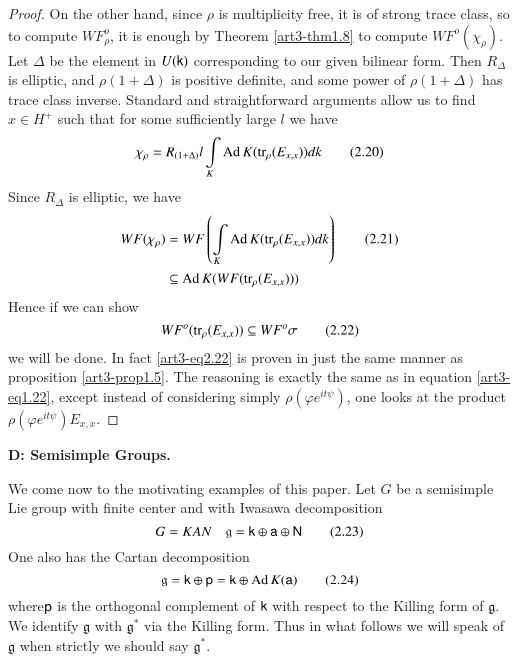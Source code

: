 \begin{proof}
On the other hand, since $\rho$ is multiplicity free, it is of strong trace class, so to compute $WF^{o}_{\rho}$, it is enough by Theorem \ref{art3-thm1.8} to compute $WF^{o}(\chi_{\rho})$. Let $\Delta$ be the element in $U(\mathsf{k})$ corresponding to our given bilinear form. Then $R_{\Delta}$ is elliptic, and $\rho(1+\Delta)$ is positive definite, and some power of $\rho(1+\Delta)$ has trace class inverse. Standard and straightforward arguments allow us to find $x\in H^{+}$ such that for some sufficiently large $l$ we have
\begin{equation*}
\chi_{\rho}=R_{(1+\Delta)}l\int\limits_{K}\operatorname{Ad} K(\operatorname{tr}_{\rho}(E_{x,x}))dk\tag{2.20}\label{art3-eq2.20}
\end{equation*}
Since $R_{\Delta}$ is elliptic, we have
\begin{align*}
WF(\chi_{\rho}) &= WF\left(\int\limits_{K}\operatorname{Ad} K(\operatorname{tr}_{\rho}(E_{x,x}))dk\right)\tag{2.21}\label{art3-eq2.21}\\
&\subseteq \operatorname{Ad} K(WF(\operatorname{tr}_{\rho}(E_{x,x})))
\end{align*}
Hence if we can show
\begin{equation*}
WF^{o}(\operatorname{tr}_{\rho}(E_{x,x}))\subseteq WF^{o}\sigma\tag{2.22}\label{art3-eq2.22}
\end{equation*}
we will be done. In fact \eqref{art3-eq2.22} is proven in just the same manner as proposition \ref{art3-prop1.5}. The reasoning is exactly the same as in equation \eqref{art3-eq1.22}, except instead of considering simply $\rho(\varphi e^{it\psi})$, one looks at the product $\rho(\varphi e^{it\psi})E_{x,x}$.
\end{proof}

\bigskip
\noindent
{\bf D: Semisimple Groups.}
\smallskip

We come now to the motivating examples of this paper. Let $G$ be a semisimple Lie group with finite center and with Iwasawa decomposition 
\begin{equation*}
G=KAN\quad \mathfrak{g}=\mathsf{k}\oplus \mathsf{a}\oplus \mathsf{N}\tag{2.23}\label{art3-eq2.23}
\end{equation*}
One also has the Cartan decomposition
\begin{equation*}
\mathfrak{g}=\mathsf{k}\oplus \mathsf{p}=\mathsf{k}\oplus \operatorname{Ad} K(\mathsf{a})\tag{2.24}\label{art3-eq2.24}
\end{equation*}
where\pageoriginale $\mathsf{p}$ is the orthogonal complement of $\mathsf{k}$ with respect to the Killing form of $\mathfrak{g}$. We identify $\mathfrak{g}$ with $\mathfrak{g}^{*}$ via the Killing form. Thus in what follows we will speak of $\mathfrak{g}$ when strictly we should say $\mathfrak{g}^{*}$.

